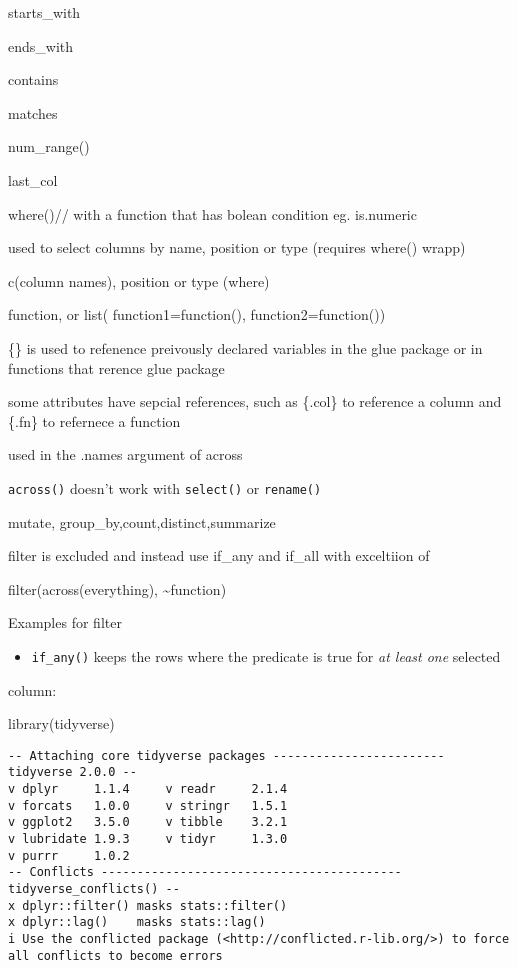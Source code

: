 \documentclass[
  letterpaper,
  DIV=11,
  numbers=noendperiod]{scrreprt}
\newenvironment{Shaded}{\begin{snugshade}}{\end{snugshade}}
\newcommand{\FunctionTok}[1]{\textcolor[rgb]{0.28,0.35,0.67}{#1}}
\newcommand{\NormalTok}[1]{\textcolor[rgb]{0.00,0.23,0.31}{#1}}
\providecommand{\tightlist}{%
  \setlength{\itemsep}{0pt}\setlength{\parskip}{0pt}}\usepackage{longtable,booktabs,array}
\begin{document}
starts\_with

ends\_with

contains

matches

num\_range()

last\_col

where()// with a function that has bolean condition eg. is.numeric

used to select columns by name, position or type (requires where()
wrapp)

c(column names), position or type (where)

function, or list( function1=function(), function2=function())

\{\} is used to refenence preivously declared variables in the glue
package or in functions that rerence glue package

some attributes have sepcial references, such as \{.col\} to reference a
column and \{.fn\} to refernece a function

used in the .names argument of across

\texttt{across()} doesn't work with \texttt{select()} or
\texttt{rename()}

mutate, group\_by,count,distinct,summarize

filter is excluded and instead use if\_any and if\_all with exceltiion
of

filter(across(everything), \textasciitilde function)

Examples for filter

\begin{itemize}
\tightlist
\item
  \texttt{if\_any()} keeps the rows where the predicate is true for
  \emph{at least one} selected
\end{itemize}

column:

\begin{Shaded}
\begin{Highlighting}[]
\FunctionTok{library}\NormalTok{(tidyverse)}
\end{Highlighting}
\end{Shaded}

\begin{verbatim}
-- Attaching core tidyverse packages ------------------------ tidyverse 2.0.0 --
v dplyr     1.1.4     v readr     2.1.4
v forcats   1.0.0     v stringr   1.5.1
v ggplot2   3.5.0     v tibble    3.2.1
v lubridate 1.9.3     v tidyr     1.3.0
v purrr     1.0.2     
-- Conflicts ------------------------------------------ tidyverse_conflicts() --
x dplyr::filter() masks stats::filter()
x dplyr::lag()    masks stats::lag()
i Use the conflicted package (<http://conflicted.r-lib.org/>) to force all conflicts to become errors
\end{verbatim}
\end{document}
